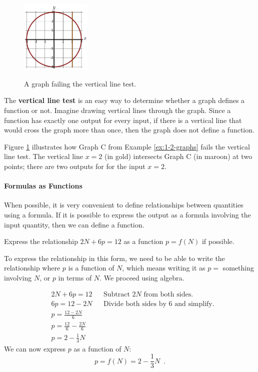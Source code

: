 \begin{figure}
    \centering
    \vspace{-12pt}
    \includegraphics[width=0.3\textwidth]{img/chap1/sec1-2/fig115.png}\\
    \caption{A graph failing the vertical line test.}
    \label{fig:1-2-115}
\end{figure}
The \textbf{vertical line test} is an easy way to determine whether a graph defines a function or not. Imagine drawing vertical lines through the graph. Since a function has exactly one output for every input, if there is a vertical line that would cross the graph more than once, then the graph does not define a function.

Figure \ref{fig:1-2-115} illustrates how Graph C from Example \ref{ex:1-2-graphs} fails the vertical line test. The vertical line $x=2$ (in gold) intersects Graph C (in maroon) at two points; there are two outputs for for the input $x=2$.

\paragraph{Formulas as Functions}

When possible, it is very convenient to define relationships between quantities using a formula. If it is possible to express the output as a formula involving the input quantity, then we can define a function.

\begin{example}
Express the relationship $2N + 6p = 12$ as a function $p = f(N)$ if possible.

\begin{solution} To express the relationship in this form, we need to be able to write
the relationship where $p$ is a function of $N$, which means
writing it as $p = $ something involving $N$, or $p$ in terms of $N$. We proceed using algebra.

\begin{align*}
&2N + 6p = 12& &\mbox{Subtract $2N$ from both sides.}\\
&6p = 12 - 2N& &\mbox{Divide both sides by 6 and simplify.}\\
&p = \frac{12-2N}{6}& & \\
&p = \frac{12}{6} - \frac{2N}{6} & &\\
&p = 2 - \frac{1}{3}N & &
\end{align*}
We can now express $p$ as a function of $N$:
$$p = f(N) = 2 - \frac{1}{3}N \enspace .$$
\end{solution}\end{example}

